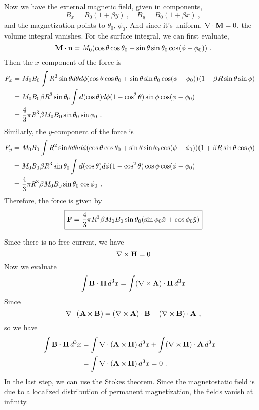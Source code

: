 \documentclass[12pt]{article}
\newcommand{\B}{{\bf B}}
\newcommand{\A}{{\bf A}}
\begin{document}
Now we have the external magnetic field, given in components,
\begin{equation}
    B_x = B_0(1 + \beta y)~, \quad B_y = B_0(1 + \beta x)~,
\end{equation}
and the magnetization points to $\theta_0$, $\phi_0$. And since it's uniform, $\nabla \cdot {\bf M} = 0$, the volume integral vanishes. For the surface integral, we can first evaluate,
\begin{equation}
    {\bf M} \cdot {\bf n} = M_0 (\cos\theta \cos \theta_0 + \sin\theta \sin \theta_0 \cos(\phi - \phi_0))~.
\end{equation}
Then the $x$-component of the force is
\begin{align}
    F_x &= M_0 B_0 \int R^2 \sin \theta d \theta d\phi (\cos\theta \cos \theta_0 + \sin\theta \sin \theta_0 \cos(\phi - \phi_0))(1 + \beta R \sin \theta \sin\phi)\cr
    &= M_0 B_0 \beta R^3 \sin \theta_0 \int d(\cos \theta) d\phi (1 - \cos^2\theta) \sin \phi \cos(\phi - \phi_0) \cr
    &= \frac{4}{3}\pi R^3 \beta M_0 B_0 \sin\theta_0 \sin \phi_0~.
\end{align}
Similarly, the $y$-component of the force is
\begin{align}
    F_y &= M_0 B_0 \int R^2 \sin \theta d \theta d\phi (\cos\theta \cos \theta_0 + \sin\theta \sin \theta_0 \cos(\phi - \phi_0))(1 + \beta R \sin \theta \cos\phi)\cr
    &= M_0 B_0 \beta R^3 \sin \theta_0 \int d(\cos \theta) d\phi (1 - \cos^2\theta) \cos \phi \cos(\phi - \phi_0) \cr
    &= \frac{4}{3}\pi R^3 \beta M_0 B_0 \sin\theta_0 \cos \phi_0~.
\end{align}
Therefore, the force is given by
\begin{equation}
    \boxed{
    {\bf F} = \frac{4}{3}\pi R^3 \beta M_0 B_0 \sin \theta_0(\sin \phi_0 \hat{x} + \cos \phi_0 \hat{y})
    }
\end{equation}

\newpage
{} Since there is no free current, we have
\begin{equation}
    \nabla \times {\bf H} = 0
\end{equation}
Now we evaluate
\begin{align}
    \int \B \cdot {\bf H}\, d^3x = \int (\nabla \times \A) \cdot {\bf H} \, d^3x
\end{align}
Since
\begin{equation}
    \nabla \cdot (\A \times \B) = (\nabla \times \A) \cdot \B - (\nabla \times \B) \cdot \A~,
\end{equation}
so we have
\begin{align}
    \int \B \cdot {\bf H} \, d^3 x &= \int \nabla \cdot (\A \times {\bf H})\, d^3x + \int (\nabla \times {\bf H}) \cdot \A\, d^3 x \cr
    &= \int \nabla \cdot(\A \times {\bf H}) \, d^3x = 0~.
\end{align}
In the last step, we can use the Stokes theorem. Since the magnetostatic field is due to a localized distribution of permanent magnetization, the fields vanish at infinity.
\end{document}
